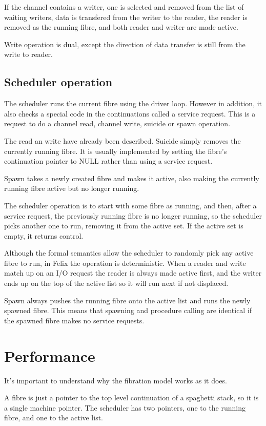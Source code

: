 \documentclass[oneside]{book}
\begin{document}
If the channel contains a writer, one is selected and removed
from the list of waiting writers, data is transfered from the writer
to the reader, the reader is removed as the running fibre, and both
reader and writer are made active.

Write operation is dual, except the direction of data transfer
is still from the write to reader.

\subsection{Scheduler operation}
The scheduler runs the current fibre using the driver loop.
However in addition, it also checks a special code in the continuations
called a service request. This is a request to do a channel read, channel
write, suicide or spawn operation.

The read an write have already been described. Suicide simply removes the
currently running fibre. It is usually implemented by setting the fibre's
continuation pointer to NULL rather than using a service request.

Spawn takes a newly created fibre and makes it active, also making
the currently running fibre active but no longer running.

The scheduler operation is to start with some fibre as running,
and then, after a service request, the previously running fibre
is no longer running, so the scheduler picks another one to run,
removing it from the active set. If the active set is empty,
it returns control.

Although the formal semantics allow the scheduler to randomly pick
any active fibre to run, in Felix the operation is deterministic.
When a reader and write match up on an I/O request the reader is
always made active first, and the writer ends up on the top
of the active list so it will run next if not displaced.

Spawn always pushes the running fibre onto the active list and runs
the newly spawned fibre. This means that spawning and procedure
calling are identical if the spawned fibre makes no service
requests.

\section{Performance}
It's important to understand why the fibration model works as it does.

A fibre is just a pointer to the top level continuation of a spaghetti stack, so it is
a single machine pointer. The scheduler has two pointers, one to the running
fibre, and one to the active list.
\end{document}
